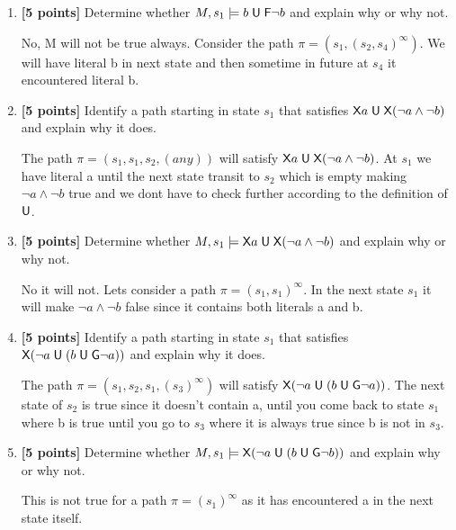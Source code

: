\documentclass{article}
\begin{document}
\begin{enumerate}
\begin{answer}
 \end{answer}
\item \textbf{[5 points]} Determine whether
  $M, s_1 \models b \mathrel{\mathsf{U}} \mathord{\mathsf{F}} \neg b$ and explain why or why
  not.
 \begin{answer}
 No, M will not be true always. Consider the path $\pi =  (s_1,(s_2,s_4)^\infty)$. We will have literal b in next state and then sometime in future at $s_4$ it encountered literal b.
 \end{answer}
\item \textbf{[5 points]} Identify a path starting in state $s_1$ that
  satisfies $\mathord{\mathsf{X}} a \mathrel{\mathsf{U}} \mathord{\mathsf{X}} (\neg a \land \neg b)$ and explain
  why it does.
 \begin{answer}
  The path $\pi =  (s_1,s_1, s_2, (any))$  will satisfy  $\mathord{\mathsf{X}} a \mathrel{\mathsf{U}} \mathord{\mathsf{X}} (\neg a \land \neg b)$. At $s_1$ we have literal a until the next state transit to $s_2$ which is empty making $\neg a \land \neg b$ true and we dont have to check further according to the definition of $\mathrel{\mathsf{U}}$.
 \end{answer}
\item \textbf{[5 points]} Determine whether
  $M, s_1 \models \mathord{\mathsf{X}} a \mathrel{\mathsf{U}} \mathord{\mathsf{X}} (\neg a \land \neg
  b)$ and explain why or why not.
 \begin{answer}
  No it will not. Lets consider a path $\pi =  (s_1, s_1)^\infty$. In the next state $s_1$ it will make  $\neg a \land \neg b$ false since it contains both literals a and b.
 \end{answer}
\item \textbf{[5 points]} Identify a path starting in state $s_1$ that
  satisfies $\mathord{\mathsf{X}} (\neg a \mathrel{\mathsf{U}} (b \mathrel{\mathsf{U}} \mathord{\mathsf{G}} \neg a))$ and
  explain why it does.
 \begin{answer}
 The path $\pi = ( s_1, s_2, s_1, (s_3)^\infty)$ will satisfy $\mathord{\mathsf{X}} (\neg a \mathrel{\mathsf{U}} (b \mathrel{\mathsf{U}} \mathord{\mathsf{G}} \neg a))$. The next state of $s_2$ is true since it doesn't contain a, until you come back to state $s_1$ where b is true until you go to $s_3$ where it is always true since b is not in $s_3$.
 \end{answer}
\item \textbf{[5 points]} Determine whether
  $M, s_1 \models \mathord{\mathsf{X}} (\neg a \mathrel{\mathsf{U}} (b \mathrel{\mathsf{U}} \mathord{\mathsf{G}} \neg b))$
  and explain why or why not.
 \begin{answer}
  This is not true for a path $\pi =  (s_1)^\infty$ as it has encountered a in the next state itself.
 \end{answer}
\end{enumerate}
\end{document}
